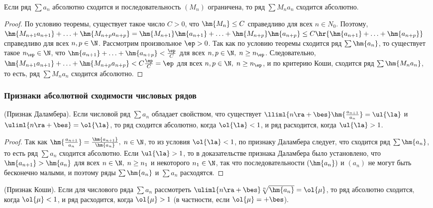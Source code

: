 \documentclass[a4paper]{article}
\begin{document}
\begin{theorem}
Если ряд $\sum a_n$ абсолютно сходится и последовательность $(M_n)$
ограничена, то ряд $\sum M_n a_n$ сходится абсолютно.
\end{theorem}

\begin{proof}
По условию теоремы, существует такое число $C>0$, что $\hm{M_n} \le
C$ справедливо для всех $n\in N_0$. Поэтому, $\hm{M_{n+1} a_{n+1}} +
\ldots + \hm{M_{n+p}a_{n+p}} = \hm{M_{n+1}} \hm{a_{n+1}} + \ldots +
\hm{M_{n+p}} \hm{a_{n+p}} \le C \hr{\hm{a_{n+1}} + \ldots +
\hm{a_{n+p}}}$ справедливо для всех $n,p\in \N$. Рассмотрим
произвольное $\ep>0$. Так как по условию теоремы сходится ряд
$\sum\hm{a_n}$, то существует такое $n_{\ep} \in\N$, что
$\hm{a_{n+1}} + \ldots + \hm{a_{n+p}} < \frac{\ep}{C}$ для всех
$n,p\in\N, \; n\ge n_{\ep}$. Следовательно, $\hm{M_{n+1}a_{n+1}} +
\ldots + \hm{M_{n+p}a_{n+p}} < C \frac{\ep}{C} = \ep$ для всех $n,p
\in\N, \; n\ge n_{\ep}$, и по критерию Коши, сходится ряд $\sum
\hm{M_n a_n}$, то есть, ряд $\sum M_n a_n$ сходится абсолютно.
\end{proof}

\subsubsection{Признаки абсолютной сходимости числовых рядов}
\begin{theorem}
(Признак Даламбера). Если числовой ряд $\sum a_n$ обладает
свойством, что существует $\lliml{n\ra+\bes}
\hm{\frac{a_{n+1}}{a_n}} = \ul{\la}$ и $\uliml{n\ra+\bes} =
\ol{\la}$, то ряд сходится абсолютно, когда $\ol{\la}<1$, и ряд
расходится, когда $\ul{\la}>1$.
\end{theorem}

\begin{proof}
Так как $\hm{\frac{a_{n+1}}{a_n}} = \frac{\hm{a_{n+1}}}{\hm{a_n}},
\; n\in\N$, то из условия $\ol{\la}<1$, по признаку Даламбера
следует, что сходится ряд $\sum\hm{a_n}$, то есть ряд $\sum a_n$
сходится абсолютно. Если $\ul{\la}>1$, то в доказательстве признака
Даламбера было установлено, что $\hm{a_{n+1}}>\hm{a_n}$ для всех
$n\in\N, \; n\ge n_1$ и некоторого $n_1\in\N$, так что
последовательности $(\hm{a_n})$ и $(a_n)$ не могут быть бесконечно
малыми, и поэтому ряды $\sum\hm{a_n}$ и $\sum a_n$ расходятся.
\end{proof}

\begin{theorem}
(Признак Коши). Если для числового ряда $\sum a_n$ рассмотреть
$\uliml{n\ra+\bes} \sqrt[n]{\hm{a_n}} = \ol{\mu}$, то ряд абсолютно
сходится, когда $\ol{\mu}<1$, и ряд расходится, когда $\ol{\mu}>1$
(в частности, если $\ol{\mu}=+\bes$).
\end{theorem}
\end{document}
